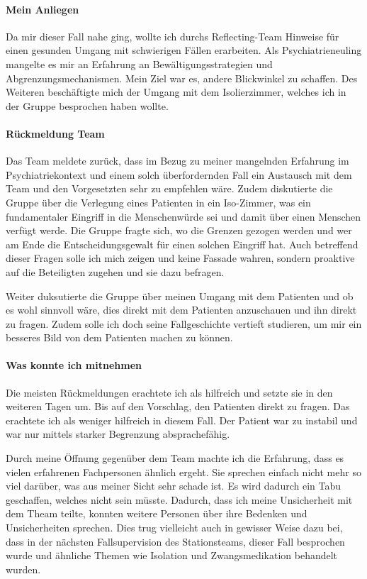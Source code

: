 \paragraph{Mein Anliegen}
Da mir dieser Fall nahe ging, wollte ich durchs Reflecting-Team Hinweise für einen gesunden Umgang mit schwierigen Fällen erarbeiten. Als Psychiatrieneuling mangelte es mir an Erfahrung an Bewältigungsstrategien und Abgrenzungsmechanismen. Mein Ziel war es, andere Blickwinkel zu schaffen. Des Weiteren beschäftigte mich der Umgang mit dem Isolierzimmer, welches ich in der Gruppe besprochen haben wollte. 

\paragraph{Rückmeldung Team}
Das Team meldete zurück, dass im Bezug zu meiner mangelnden Erfahrung im Psychiatriekontext und einem solch überfordernden Fall ein Austausch mit dem Team und den Vorgesetzten sehr zu empfehlen wäre. Zudem diskutierte die Gruppe über die Verlegung eines Patienten in ein Iso-Zimmer, was ein fundamentaler Eingriff in die Menschenwürde sei und damit über einen Menschen verfügt werde. Die Gruppe fragte sich, wo die Grenzen gezogen werden und wer am Ende die Entscheidungsgewalt für einen solchen Eingriff hat. Auch betreffend dieser Fragen solle ich mich zeigen und keine Fassade wahren, sondern proaktive auf die Beteiligten zugehen und sie dazu befragen. 

Weiter duksutierte die Gruppe über meinen Umgang mit dem Patienten und ob es wohl sinnvoll wäre, dies direkt mit dem Patienten anzuschauen und ihn direkt zu fragen. Zudem solle ich doch seine Fallgeschichte vertieft studieren, um mir ein besseres Bild von dem Patienten machen zu können.

\paragraph{Was konnte ich mitnehmen}
Die meisten Rückmeldungen erachtete ich als hilfreich und setzte sie in den weiteren Tagen um. Bis auf den Vorschlag, den Patienten direkt zu fragen. Das erachtete ich als weniger hilfreich in diesem Fall. Der Patient war zu instabil und war nur mittels starker Begrenzung absprachefähig. 

Durch meine Öffnung gegenüber dem Team machte ich die Erfahrung, dass es vielen erfahrenen Fachpersonen ähnlich ergeht. Sie sprechen einfach nicht mehr so viel darüber, was aus meiner Sicht sehr schade ist. Es wird dadurch ein Tabu geschaffen, welches nicht sein müsste. Dadurch, dass ich meine Unsicherheit mit dem Theam teilte, konnten weitere Personen über ihre Bedenken und Unsicherheiten sprechen. Dies trug vielleicht auch in gewisser Weise dazu bei, dass in der nächsten Fallsupervision des Stationsteams, dieser Fall besprochen wurde und ähnliche Themen wie Isolation und Zwangsmedikation behandelt wurden.

